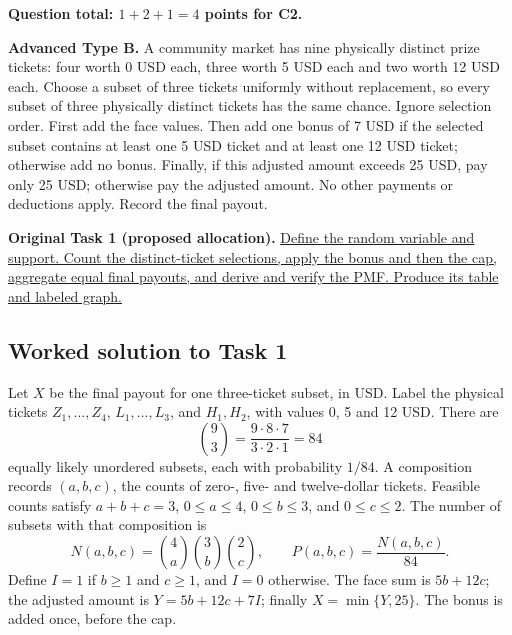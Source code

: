 \par\vspace{3mm}\secInicio[][sec:q5]

\textbf{Question total: $1+2+1=4$ points for C2.}

\clearpage
{}

\textbf{Advanced Type B.} A community market has nine physically distinct prize tickets: four worth 0 USD each, three worth 5 USD each and two worth 12 USD each. Choose a subset of three tickets uniformly without replacement, so every subset of three physically distinct tickets has the same chance. Ignore selection order. First add the face values. Then add one bonus of 7 USD if the selected subset contains at least one 5 USD ticket and at least one 12 USD ticket; otherwise add no bonus. Finally, if this adjusted amount exceeds 25 USD, pay only 25 USD; otherwise pay the adjusted amount. No other payments or deductions apply. Record the final payout.

\textbf{Original Task 1 (proposed allocation).} \hyperref[sol:q6t1]{Define the random variable and support. Count the distinct-ticket selections, apply the bonus and then the cap, aggregate equal final payouts, and derive and verify the PMF. Produce its table and labeled graph.} 


\subsection*{Worked solution to Task 1 }
\label{sol:q6t1}

Let $X$ be the final payout for one three-ticket subset, in USD. Label the physical tickets $Z_1,\ldots,Z_4$, $L_1,\ldots,L_3$, and $H_1,H_2$, with values 0, 5 and 12 USD. There are
\[
\binom93=\frac{9\cdot8\cdot7}{3\cdot2\cdot1}=84
\]
equally likely unordered subsets, each with probability $1/84$. A composition records $(a,b,c)$, the counts of zero-, five- and twelve-dollar tickets. Feasible counts satisfy $a+b+c=3$, $0\leq a\leq4$, $0\leq b\leq3$, and $0\leq c\leq2$. The number of subsets with that composition is
\[
N(a,b,c)=\binom4a\binom3b\binom2c,\qquad P(a,b,c)=\frac{N(a,b,c)}{84}.
\]
Define $I=1$ if $b\geq1$ and $c\geq1$, and $I=0$ otherwise. The face sum is $5b+12c$; the adjusted amount is $Y=5b+12c+7I$; finally $X=\min\{Y,25\}$. The bonus is added once, before the cap.

\begingroup\renewcommand{\arraystretch}{1.35}

